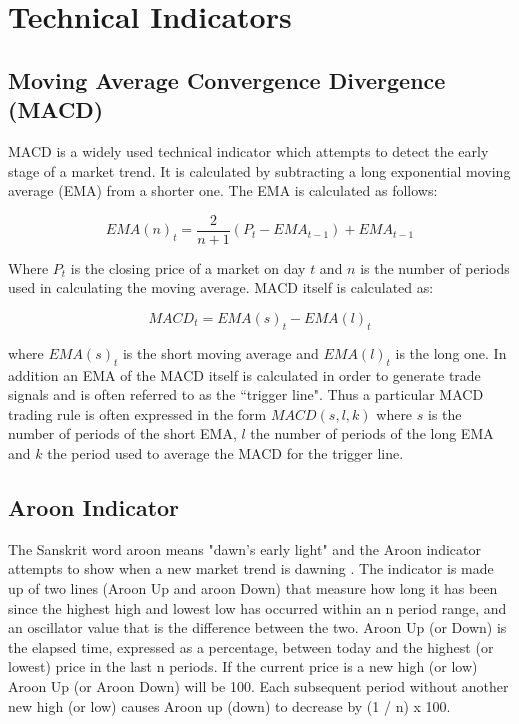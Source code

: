 
\chapter{Technical Indicators} %

\label{AppendixB} %



\section{Moving Average Convergence Divergence (MACD)}
\label{appB:MACD}
MACD is a widely used technical indicator which attempts to detect the early stage of a market trend. It is calculated by subtracting a long exponential moving average (EMA) from a shorter one. The EMA is calculated as follows:

\[ EMA(n)_{t} = \dfrac{2}{n+1}(P_{t}-EMA_{t-1}) + EMA_{t-1}\]

Where $ P_{t} $ is the closing price of a market on day $ t $ and $ n $ is the number of periods used in calculating the moving average. MACD itself is calculated as:

\[ MACD_{t} = EMA(s)_{t} - EMA(l)_{t} \]

where $ EMA(s)_{t} $ is the short moving average and $ EMA(l)_{t} $ is the long one. In addition an EMA of the MACD itself is calculated in order to generate trade signals and is often referred to as the \textquotedblleft trigger line". Thus a particular MACD trading rule is often expressed in the form $ MACD(s,l,k) $ where $ s $ is the number of periods of the short EMA, $ l $ the number of periods of the long EMA and $ k $ the period used to average the MACD for the trigger line.

\section{Aroon Indicator}
\label{appB:aroon}
The Sanskrit word aroon means "dawn's early light" and the Aroon indicator attempts to show when a new market trend is dawning \citep{chande1994new}. The indicator is made up of two lines (Aroon Up and aroon Down) that measure how long it has been since the highest high and lowest low has occurred within an n period range, and an oscillator value that is the difference between the two. Aroon Up (or Down) is the elapsed time, expressed as a percentage, between today and the highest (or lowest) price in the last n periods. If the current price is a new high (or low) Aroon Up (or Aroon Down) will be 100. Each subsequent period without another new high (or low) causes Aroon up (down) to decrease by (1 / n) x 100.

